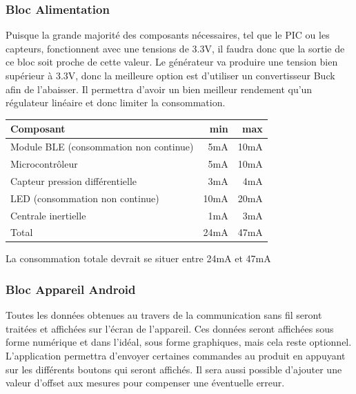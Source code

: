 \subsubsection{Bloc Alimentation}
    Puisque la grande majorité des composants nécessaires, tel que le PIC ou les capteurs, fonctionnent avec une tensions de 3.3V, il faudra donc que la sortie de ce bloc soit proche de cette valeur. Le générateur va produire une tension bien supérieur à 3.3V, donc la meilleure option est d'utiliser un convertisseur Buck afin de l'abaisser. Il permettra d'avoir un bien meilleur rendement qu'un régulateur linéaire et donc limiter la consommation.
    \begin{table}[h!]
        \centering
        \begin{tabular}{| l || r | r |}
            \hline
            Composant & min & max \\
            \hline
            Module BLE (consommation non continue)  & 5mA & 10mA \\
            Microcontrôleur & 5mA & 10mA\\
            Capteur pression différentielle & 3mA & 4mA \\
            LED (consommation non continue) & 10mA & 20mA \\
            Centrale inertielle & 1mA & 3mA \\
            \hline
            Total & 24mA & 47mA\\
            \hline
        \end{tabular}
    \end{table}
    
    La consommation totale devrait se situer entre 24mA et 47mA\newpage

        
        
    \subsubsection{Bloc Appareil Android}
        Toutes les données obtenues au travers de la communication sans fil seront traitées et affichées sur l'écran de l'appareil. Ces données seront affichées sous forme numérique et dans l'idéal, sous forme graphiques, mais cela reste optionnel. L'application permettra d'envoyer certaines commandes au produit en appuyant sur les différents boutons qui seront affichés. Il sera aussi possible d'ajouter une valeur d'offset aux mesures pour compenser une éventuelle erreur. 
        \vspace{1cm}
        
